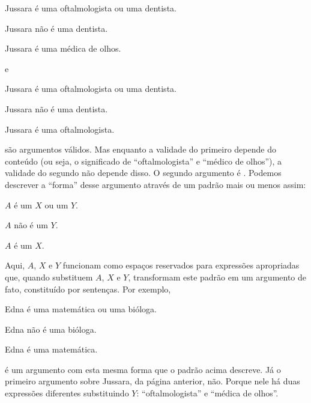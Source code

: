 \begin{earg}
	\item[] Jussara é uma oftalmologista ou uma dentista.
	\item[] Jussara não é uma dentista.
	\item[\therefore] Jussara é uma médica de olhos.
\end{earg}
e
\begin{earg}
	\item[] Jussara é uma oftalmologista ou uma dentista.
	\item[] Jussara não é uma dentista.
	\item[\therefore] Jussara é uma oftalmologista.
\end{earg}
são argumentos válidos. Mas enquanto a validade do primeiro depende do conteúdo (ou seja, o significado de ``oftalmologista'' e ``médico de olhos''), a validade do segundo não depende disso.
O segundo argumento é .
Podemos descrever a ``forma'' desse argumento através de um padrão mais ou menos assim:
\begin{earg}
	\item[] $A$ é um $X$ ou um $Y$.
	\item[] $A$ não é um $Y$.
	\item[\therefore] $A$ é um $X$.
\end{earg}
Aqui, $A$, $X$ e $Y$ funcionam como espaços reservados para expressões apropriadas que, quando substituem $A$, $X$ e $Y$, transformam este padrão em um argumento de fato, constituído por sentenças.
Por exemplo,
\begin{earg}
	\item[] Edna é uma matemática ou uma bióloga.
	\item[] Edna não é uma bióloga.
	\item[\therefore] Edna é uma matemática.
\end{earg}
é um argumento com esta mesma forma que o padrão acima descreve.
Já o primeiro argumento sobre Jussara, da página anterior, não.
Porque nele há duas expressões diferentes substituindo $Y$: ``oftalmologista'' e ``médica de olhos''.

